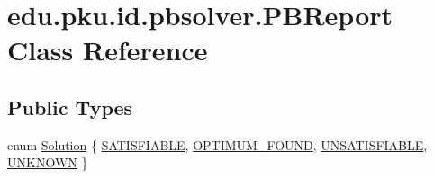 \hypertarget{classedu_1_1pku_1_1id_1_1pbsolver_1_1_p_b_report}{
\section{edu.pku.id.pbsolver.PBReport Class Reference}
\label{classedu_1_1pku_1_1id_1_1pbsolver_1_1_p_b_report}
}
\subsection*{Public Types}
\begin{DoxyCompactItemize}
\item 
enum \hyperlink{classedu_1_1pku_1_1id_1_1pbsolver_1_1_p_b_report_ac8d114f4470bac0e3d21bd99f818b477}{Solution} \{ \hyperlink{classedu_1_1pku_1_1id_1_1pbsolver_1_1_p_b_report_ac8d114f4470bac0e3d21bd99f818b477}{SATISFIABLE}, 
\hyperlink{classedu_1_1pku_1_1id_1_1pbsolver_1_1_p_b_report_ac8d114f4470bac0e3d21bd99f818b477}{OPTIMUM\_\-FOUND}, 
\hyperlink{classedu_1_1pku_1_1id_1_1pbsolver_1_1_p_b_report_ac8d114f4470bac0e3d21bd99f818b477}{UNSATISFIABLE}, 
\hyperlink{classedu_1_1pku_1_1id_1_1pbsolver_1_1_p_b_report_ac8d114f4470bac0e3d21bd99f818b477}{UNKNOWN}
 \}
\end{DoxyCompactItemize}
